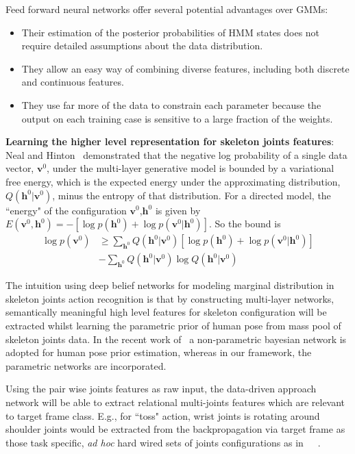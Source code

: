 Feed forward neural networks offer several potential advantages over GMMs:
\begin{itemize}
\item Their estimation of the posterior probabilities of HMM states does not require detailed assumptions about the data distribution.
\item They allow an easy way of combining diverse features, including both discrete and continuous features.
\item They use far more of the data to constrain each parameter because the output on each training case is sensitive to a large fraction of the weights.
\end{itemize}
\textbf{Learning the higher level representation for skeleton joints features}: \label{skeleon_high_level}\newline Neal and Hinton~\cite{neal1998view} demonstrated that the negative log probability of a single data vector, $\textbf{v}^0$, under the multi-layer generative model is bounded by a variational free energy, which is the expected energy under the approximating distribution, $Q(\textbf{h}^0 |\textbf{v}^0 )$, minus the entropy of that distribution. For a directed model, the ``energy" of the configuration $\textbf{v}^0 $,$\textbf{h}^0$ is given by $  E(\textbf{v}^0, \textbf{h}^0) = - [ \log p(\textbf{h}^0)+ \log p(\textbf{v}^0 | \textbf{h}^0)]$.
So the bound is
\begin{align*}
    \log p(\textbf{v}^0) &\geqslant \sum_{\textbf{h}^0} Q(\textbf{h}^0 | \textbf{v}^0) [ \log p (\textbf{h}^0) + \log p (\textbf{v}^0 | \textbf{h}^0)] \\
     &- \sum_{\textbf{h}^0} Q(\textbf{h}^0 | \textbf{v}^0) \log Q(\textbf{h}^0 |\textbf{v}^0)
\end{align*}

The intuition using deep belief networks for modeling marginal distribution \emissionprob{} in skeleton joints action recognition is that by constructing multi-layer networks, semantically meaningful high level features for skeleton configuration will be extracted whilst learning the parametric prior of human pose from mass pool of skeleton joints data. In the recent work of~\cite{6751269} a non-parametric bayesian network is adopted for human pose prior estimation, whereas in our framework, the parametric networks are incorporated.

Using the pair wise joints features as raw input, the data-driven approach network will be able to extract relational multi-joints features which are relevant to target frame class. E.g., for ``toss" action, wrist joints is rotating around shoulder joints would be extracted from the backpropagation via target frame as those task specific, \emph{ad hoc} hard wired sets of joints configurations as in~\cite{chaudhry2013bio}~\cite{muller2006motion}\cite{nowozin2012action}~\cite{ofli2013sequence}.

